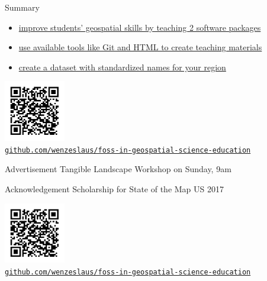 \documentclass[xcolor={dvipsnames,usenames},beamer,aspectratio=169]{beamer}
\begin{document}
\begin{frame}{}

\begin{block}{Summary}
 \begin{itemize}
  \item \href{http://dx.doi.org/10.3390/ijgi4020942}%
    {improve students' geospatial skills by teaching 2 software packages}
  \item \href{http://dx.doi.org/10.3390/ijgi4020942}%
    {use available tools like Git and HTML to create teaching materials}
  \item \href{http://grasswiki.osgeo.org/wiki/GRASS_GIS_Standardized_Sample_Datasets}%
    {create a dataset with standardized names for your region}
 \end{itemize}

\end{block}

\bigskip

\centering
\href{https://github.com/wenzeslaus/foss-in-geospatial-science-education}{%
\includegraphics[width=0.2\textwidth]{./images/general/slides_qr}\\%
\texttt{github.com/wenzeslaus/foss-in-geospatial-science-education}%
}

\end{frame}

\begin{frame}{}

\begin{block}{Advertisement}
Tangible Landscape Workshop on Sunday, 9am
\end{block}

\begin{block}{Acknowledgement}
Scholarship for State of the Map US 2017
\end{block}

\bigskip

\centering
\href{https://github.com/wenzeslaus/foss-in-geospatial-science-education}{%
\includegraphics[width=0.2\textwidth]{./images/general/slides_qr}\\%
\texttt{github.com/wenzeslaus/foss-in-geospatial-science-education}%
}

\end{frame}
\end{document}
